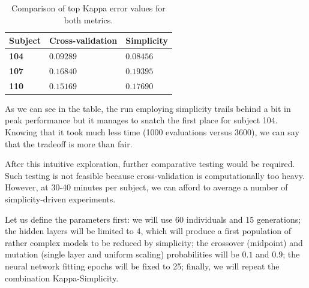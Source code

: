 	\begin{table}[h]

        \centering
        \setlength\arrayrulewidth{0.8pt}

        \begin{tabular}{| >{\centering\arraybackslash}m{0.5in} | >{\centering\arraybackslash}m{1.2in} | >{\centering\arraybackslash}m{1.2in} |}

            \hline
            \rowcolor{RoyalBlue}
            \textbf{Subject} & \textbf{Cross-validation} & \textbf{Simplicity} \\
            \hline
            \cellcolor{RoyalBlue}\textbf{104} & $0.09289$ & $0.08456$ \\
            \hline
            \cellcolor{RoyalBlue}\textbf{107} & $0.16840$ & $0.19395$ \\
            \hline
            \cellcolor{RoyalBlue}\textbf{110} & $0.15169$ & $0.17690$ \\
            \hline

        \end{tabular}

        \caption[Best Kappa values using cross-validation and simplicity]{Comparison of top Kappa error values for both metrics.}\label{table:best_cv_vs_simplicity}

    \end{table}

    As we can see in the table, the run employing simplicity trails behind a bit in peak performance but it manages to snatch the first place for subject 104. Knowing that it took much less time (1000 evaluations versus 3600), we can say that the tradeoff is more than fair.

    After this intuitive exploration, further comparative testing would be required. Such testing is not feasible because cross-validation is computationally too heavy. However, at 30-40 minutes per subject, we can afford to average a number of simplicity-driven experiments. 

    Let us define the parameters first: we will use 60 individuals and 15 generations; the hidden layers will be limited to 4, which will produce a first population of rather complex models to be reduced by simplicity; the crossover (midpoint) and mutation (single layer and uniform scaling) probabilities will be $0.1$ and $0.9$; the neural network fitting epochs will be fixed to 25; finally, we will repeat the combination Kappa-Simplicity.

\newpage

